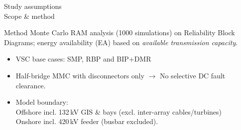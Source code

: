 

\begin{frame}{Study assumptions\\Scope \& method}
  \begin{block}{Method}
    Monte Carlo RAM analysis (1000 simulations) on Reliability Block Diagrams; energy availability (EA) based on \emph{available transmission capacity}.
  \end{block}
  \vspace{0.2em}
  \begin{itemize}
    \setlength{\itemsep}{0.35em}
    \item VSC base cases: SMP, RBP and BIP+DMR
    \item Half-bridge MMC with disconnectors only $\rightarrow$ No selective DC fault clearance.
    \item Model boundary:\\
    Offshore incl. 132\,kV GIS \& bays (excl. inter-array cables/turbines)\\
    Onshore incl. 420\,kV feeder (busbar excluded).
  \end{itemize}
\end{frame}

